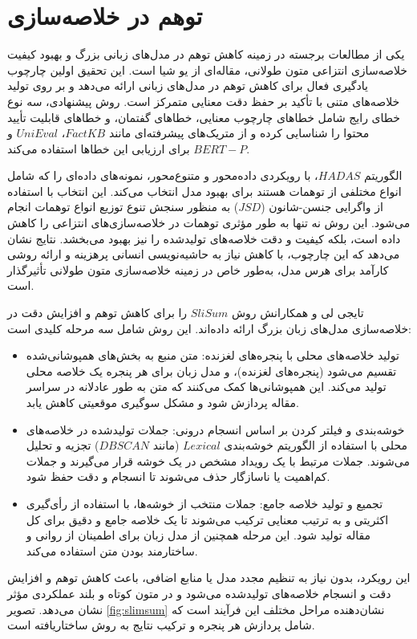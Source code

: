 \section{توهم در خلاصه‌سازی}
یکی از مطالعات برجسته در زمینه کاهش توهم در مدل‌های زبانی بزرگ  و بهبود کیفیت خلاصه‌سازی انتزاعی متون طولانی، مقاله‌ای از یو شیا است. این تحقیق اولین چارچوب یادگیری فعال برای کاهش توهم در مدل‌های زبانی ارائه می‌دهد و بر روی تولید خلاصه‌های متنی با تأکید بر حفظ دقت معنایی متمرکز است. روش پیشنهادی، سه نوع خطای رایج شامل خطاهای چارچوب معنایی، خطاهای گفتمان، و خطاهای قابلیت تأیید محتوا را شناسایی کرده و از متریک‌های پیشرفته‌ای مانند $FactKB$، $UniEval$ و$ BERT-P$ برای ارزیابی این خطاها استفاده می‌کند.

الگوریتم $HADAS$، با رویکردی داده‌محور و متنوع‌محور، نمونه‌های داده‌ای را که شامل انواع مختلفی از توهمات هستند برای بهبود مدل انتخاب می‌کند. این انتخاب با استفاده از واگرایی جنسن-شانون ($JSD$) به منظور سنجش تنوع توزیع انواع توهمات انجام می‌شود. این روش نه تنها به طور مؤثری توهمات در خلاصه‌سازی‌های انتزاعی را کاهش داده است، بلکه کیفیت و دقت خلاصه‌های تولیدشده را نیز بهبود می‌بخشد. نتایج نشان می‌دهد که این چارچوب، با کاهش نیاز به حاشیه‌نویسی انسانی پرهزینه و ارائه روشی کارآمد برای هرس مدل، به‌طور خاص در زمینه خلاصه‌سازی متون طولانی تأثیرگذار است\cite{xia2024hallucinationdiversityawareactivelearning}.


 تایجی لی و همکارانش روش $SliSum$ را برای کاهش توهم و افزایش دقت در خلاصه‌سازی مدل‌های زبان بزرگ ارائه داده‌اند. این روش شامل سه مرحله کلیدی است:
\begin{itemize}
	\item 
تولید خلاصه‌های محلی با پنجره‌های لغزنده: متن منبع به بخش‌های همپوشانی‌شده تقسیم می‌شود (پنجره‌های لغزنده)، و مدل زبان برای هر پنجره یک خلاصه محلی تولید می‌کند. این همپوشانی‌ها کمک می‌کنند که متن به طور عادلانه در سراسر مقاله پردازش شود و مشکل سوگیری موقعیتی کاهش یابد.
\item 
خوشه‌بندی و فیلتر کردن بر اساس انسجام درونی: جملات تولیدشده در خلاصه‌های محلی با استفاده از الگوریتم خوشه‌بندی $Lexical$ (مانند $DBSCAN$) تجزیه و تحلیل می‌شوند. جملات مرتبط با یک رویداد مشخص در یک خوشه قرار می‌گیرند و جملات کم‌اهمیت یا ناسازگار حذف می‌شوند تا انسجام و دقت حفظ شود.
\item 
تجمیع و تولید خلاصه جامع: جملات منتخب از خوشه‌ها، با استفاده از رأی‌گیری اکثریتی و به ترتیب معنایی ترکیب می‌شوند تا یک خلاصه جامع و دقیق برای کل مقاله تولید شود. این مرحله همچنین از مدل زبان برای اطمینان از روانی و ساختارمند بودن متن استفاده می‌کند.
\end{itemize}
این رویکرد، بدون نیاز به تنظیم مجدد مدل یا منابع اضافی، باعث کاهش توهم و افزایش دقت و انسجام خلاصه‌های تولیدشده می‌شود و در متون کوتاه و بلند عملکردی مؤثر نشان می‌دهد. تصویر \ref{fig:slimsum} نشان‌دهنده مراحل مختلف این فرآیند است که شامل پردازش هر پنجره و ترکیب نتایج به روش ساختاریافته است.





